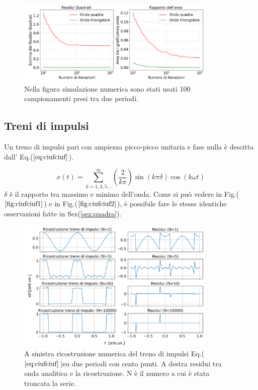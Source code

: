 \documentclass{article}
\begin{document}
      

        \begin{figure}[H]
            \centering
            \includegraphics[width=0.85\textwidth]{residuals2.png} %
            \caption{Nella figura simulazione numerica sono stati usati 100 campionamenti presi tra due periodi.}
            \label{fig:res2}
        \end{figure}

    \subsection{Treni di impulsi}
    Un treno di impulsi pari con ampiezza picco-picco unitaria e fase nulla è descitta
    dall' Eq.($\ref{eq:ciufciuf}$).

    \begin{equation}
        x(t) = \sum_{k=1,3,5...}^{\infty} \left(\frac{2}{k\pi}\right)\sin\left(k\pi\delta\right)\cos\left(k\omega t\right)
        \label{eq:ciufciuf}
    \end{equation}
    $\delta$ è il rapporto tra massimo e minimo dell'onda.
    Come si può vedere in Fig.($\ref{fig:ciufciuf1} $) e in Fig.($\ref{fig:ciufciuf2} $),
    è possibile fare le stesse identiche osservazioni fatte in Sez(\ref{sez:quadra}).
    \begin{figure}[H]
        \centering
        \includegraphics[width=0.85\textwidth]{foupulsetrainwave1e2.png} %
        \caption{A sinistra ricostruzione numerica del treno di impulsi
        Eq.($\ref{eq:ciufciuf}$)su due periodi con cento punti.
        A destra residui tra onda analitica e la ricostruzione.
        N è il numero a cui è stata troncata la serie. }
        \label{fig:ciufciuf1}
    \end{figure}
\end{document}
